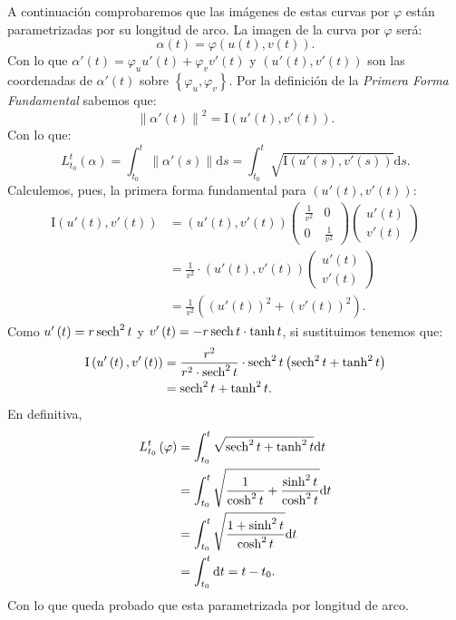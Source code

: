 A continuación comprobaremos que las imágenes de estas curvas por $\varphi$
están parametrizadas por su longitud de arco. La imagen de la curva por
$\varphi$ será:
\[
\alpha\left( t \right) = \varphi\left( u\left( t \right), v \left( t \right) \right).
\]
Con lo que $\alpha'\left( t \right) = \varphi_u u'\left( t \right) + \varphi_v
v'\left( t \right)$ y $\left( u'\left( t \right), v'\left( t \right) \right)$
son las coordenadas de $\alpha'\left( t \right)$ sobre $\left\{ \varphi_u,
\varphi_v \right\}$. Por la definición de la \textit{Primera Forma Fundamental}
sabemos que:
\[
\left\lVert \alpha'\left( t \right) \right\rVert^2 = \mathrm{I}
\left( u'\left( t \right), v'\left( t \right) \right).
\]
Con lo que:
\[
L_{t_0}^t \left( \alpha \right) = \int_{t_0}^{t} \left\lVert \alpha'\left( s
\right) \right\rVert \mathrm{d}s = \int_{t_0}^{t}
\sqrt{\mathrm{I} \left( u'\left( s \right), v'\left( s
\right) \right)} \mathrm{d}s.
\]
Calculemos, pues, la primera forma fundamental para $\left( u'\left( t \right),
v'\left( t \right) \right)$:
\begin{align*}
\mathrm{I} \left( u'\left( t \right), v'\left( t
\right) \right) &= \left( u'\left( t \right), v'\left( t \right) \right)
\begin{pmatrix} \frac{1}{v^2} & 0\\ 0 & \frac{1}{v^2} \end{pmatrix}
\begin{pmatrix} u'\left( t \right)\\ v'\left( t \right) \end{pmatrix}\\ 
&= \frac{1}{v^2} \cdot \left( u'\left( t \right), v'\left( t \right) \right) \begin{pmatrix} u'\left( t \right)\\ v'\left( t \right) \end{pmatrix}\\
&= \frac{1}{v^2} \left( \left( u'\left( t \right) \right)^2 + \left( v'\left( t
\right) \right)^2 \right).
\end{align*}
Como $u'\left( t \right) = r \operatorname{sech}^2 t$ y $v'\left( t \right) = -r \operatorname{sech} t
\cdot \tanh t$, si sustituimos tenemos que:
\begin{align*}
\mathrm{I}\left( u'\left( t \right), v'\left( t
\right) \right) &= \frac{r^2}{r^2 \cdot \operatorname{sech}^2 t} \cdot \operatorname{sech}^2 t \left( \operatorname{sech}^2 t + \tanh^2 t
\right)\\
&= \operatorname{sech}^2 t + \tanh^2 t.
\end{align*}
En definitiva,
\begin{align*}
L_{t_0}^t \left( \varphi \right) &= \int_{t_0}^{t} \sqrt{\operatorname{sech}^2 t + \tanh^2
t} \mathrm{d}t\\
&= \int_{t_0}^{t} \sqrt{\frac{1}{\cosh^2 t} + \frac{\sinh^2 t}{\cosh^2 t}}
\mathrm{d}t\\
&= \int_{t_0}^{t} \sqrt{\frac{1 + \sinh^2 t}{\cosh^2 t}} \mathrm{d}t\\
&= \int_{t_0}^{t}  \mathrm{d}t= t - t_0.
\end{align*}
Con lo que queda probado que esta parametrizada por longitud de arco.

